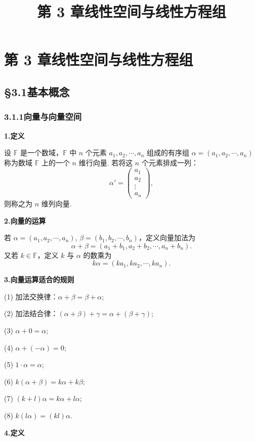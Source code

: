 \documentclass[UTF8, 12pt, fontset=fandol, oneside]{ctexart}
\title{第 3 章\quad 线性空间与线性方程组}
\author{}
\date{}
\begin{document}
\maketitle

\section*{第 3 章\quad 线性空间与线性方程组}

\subsection*{§3.1\quad 基本概念}

\subsubsection*{3.1.1\quad 向量与向量空间}

\noindent\textbf{1.\quad 定义}

设 $\mathbb{F}$ 是一个数域，$\mathbb{F}$ 中 $n$ 个元素 $a_1,a_2,\cdots,a_n$ 组成的有序组
$\alpha=(a_1,a_2,\cdots,a_n)$ 称为数域 $\mathbb{F}$ 上的一个 $n$ 维行向量. 若将这 $n$ 个元素排成一列：
\[
\alpha'=
\begin{pmatrix}
a_1\\
a_2\\
\vdots\\
a_n
\end{pmatrix},
\]
则称之为 $n$ 维列向量.

\noindent\textbf{2.\quad 向量的运算}

若 $\alpha=(a_1,a_2,\cdots,a_n)$, $\beta=(b_1,b_2,\cdots,b_n)$，定义向量加法为
\[
\alpha+\beta=(a_1+b_1,a_2+b_2,\cdots,a_n+b_n).
\]
又若 $k\in\mathbb{F}$，定义 $k$ 与 $\alpha$ 的数乘为
\[
k\alpha=(ka_1,ka_2,\cdots,ka_n).
\]

\noindent\textbf{3.\quad 向量运算适合的规则}

(1) 加法交换律：$\alpha+\beta=\beta+\alpha$;

(2) 加法结合律：$(\alpha+\beta)+\gamma=\alpha+(\beta+\gamma)$;

(3) $\alpha+0=\alpha$;

(4) $\alpha+(-\alpha)=0$;

(5) $1\cdot\alpha=\alpha$;

(6) $k(\alpha+\beta)=k\alpha+k\beta$;

(7) $(k+l)\alpha=k\alpha+l\alpha$;

(8) $k(l\alpha)=(kl)\alpha$.

\noindent\textbf{4.\quad 定义}
\end{document}
